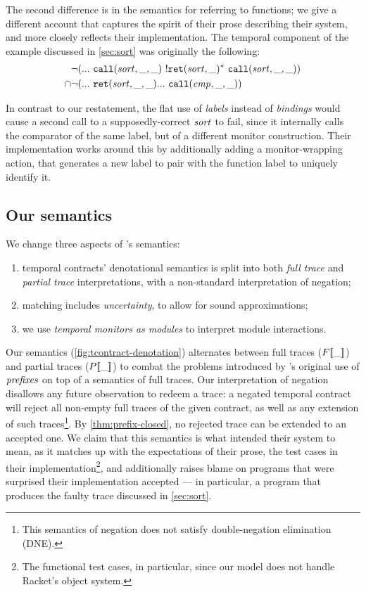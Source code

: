 The second difference is in the semantics for referring to functions; we give a different account that captures the spirit of their prose describing their system, and more closely reflects their implementation.
%
The temporal component of the example discussed in \autoref{sec:sort} was originally the following:
\begin{align*}
 &\neg ({\tt ...}~ {\tt call}(\mathit{sort},\_,\_)~ {}! {\tt ret}(\mathit{sort},\_)^*~ {\tt call}(\mathit{sort},\_,\_))
 \\ \cap& \neg ({\tt ...}~ {\tt ret}(\mathit{sort},\_,\_) {\tt ...}~ {\tt call}(\mathit{cmp},\_,\_))
\end{align*}

In contrast to our restatement, the flat use of \emph{labels} instead of \emph{bindings} would cause a second call to a supposedly-correct $\mathit{sort}$ to fail, since it internally calls the comparator of the same label, but of a different monitor construction.
%
Their implementation works around this by additionally adding a monitor-wrapping action, that generates a new label to pair with the function label to uniquely identify it.

\subsection{Our semantics}
%
We change three aspects of \dfm's semantics:
\begin{enumerate}
  \item{temporal contracts' denotational semantics is split into both \emph{full trace} and \emph{partial trace} interpretations, with a non-standard interpretation of negation;}
  \item{matching includes \emph{uncertainty}, to allow for sound approximations;}
  \item{we use \emph{temporal monitors as modules} to interpret module interactions.}
\end{enumerate}
%

%
Our semantics (\autoref{fig:tcontract-denotation}) alternates between full traces ($F[\![ \_ ]\!]$) and partial traces ($P[\![ \_ ]\!]$) to combat the problems introduced by \dfm's original use of $\mathit{prefixes}$ on top of a semantics of full traces.
%
Our interpretation of negation disallows any future observation to redeem a trace: a negated temporal contract will reject all non-empty full traces of the given contract, as well as any extension of such traces\footnote{This semantics of negation does not satisfy double-negation elimination (DNE).}.
%
By \autoref{thm:prefix-closed}, no rejected trace can be extended to an accepted one.
%
We claim that this semantics is what \dfm{} intended their system to mean, as it matches up with the expectations of their prose, the test cases in their implementation\footnote{The functional test cases, in particular, since our model does not handle Racket's object system.}, and additionally raises blame on programs that \dfm{} were surprised their implementation accepted --- in particular, a program that produces the faulty trace discussed in \autoref{sec:sort}.
%

